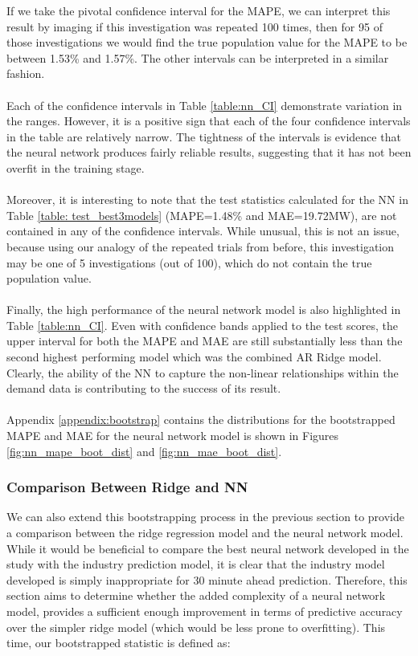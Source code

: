 \documentclass[11pt]{article}
\begin{document}
\noindent If we take the pivotal confidence interval for the MAPE, we can interpret this result by imaging if this investigation was repeated 100 times, then for 95 of those investigations we would find the true population value for the MAPE to be between 1.53\% and 1.57\%. The other intervals can be interpreted in a similar fashion.
\\
\\
Each of the confidence intervals in Table \ref{table:nn_CI} demonstrate variation in the ranges. However, it is a positive sign that each of the four confidence intervals in the table are relatively narrow. The tightness of the intervals is evidence that the neural network produces fairly reliable results, suggesting that it has not been overfit in the training stage. 
\\
\\
Moreover, it is interesting to note that the test statistics calculated for the NN in Table \ref{table: test_best3models} (MAPE=1.48\% and MAE=19.72MW), are not contained in any of the confidence intervals. While unusual, this is not an issue, because using our analogy of the repeated trials from before, this investigation may be one of 5 investigations (out of 100), which do not contain the true population value.
\\
\\
Finally, the high performance of the neural network model is also highlighted in Table \ref{table:nn_CI}. Even with confidence bands applied to the test scores, the upper interval for both the MAPE and MAE are still substantially less than the second highest performing model which was the combined AR Ridge model. Clearly, the ability of the NN to capture the non-linear relationships within the demand data is contributing to the success of its result.
\\
\\
Appendix \ref{appendix:bootstrap} contains the distributions for the bootstrapped MAPE and MAE for the neural network model is shown in Figures \ref{fig:nn_mape_boot_dist} and \ref{fig:nn_mae_boot_dist}.

\subsubsection{Comparison Between Ridge and NN}

We can also extend this bootstrapping process in the previous section to provide a comparison between the ridge regression model and the neural network model. While it would be beneficial to compare the best neural network developed in the study with the industry prediction model, it is clear that the industry model developed is simply inappropriate for 30 minute ahead prediction. Therefore, this section aims to determine whether the added complexity of a neural network model, provides a sufficient enough improvement in terms of predictive accuracy over the simpler ridge model (which would be less prone to overfitting). This time, our bootstrapped statistic is defined as:
\end{document}
